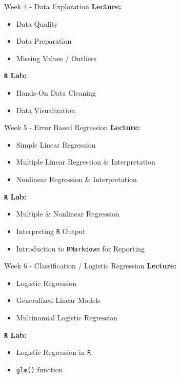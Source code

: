 \documentclass[aspectratio=169,xcolor=dvipsnames]{beamer}
\begin{document}
\begin{frame}{Week 4 - Data Exploration}
\textbf{Lecture:}
    \begin{itemize}
        \setlength{\itemsep}{.25cm}
        \item Data Quality
        \item Data Preparation
        \item Missing Values / Outliers
    \end{itemize}
\textbf{\texttt{R} Lab:}
    \begin{itemize}
        \item Hands-On Data Cleaning
        \item Data Visualization
    \end{itemize}
\end{frame}

\begin{frame}{Week 5 - Error Based Regression}
\textbf{Lecture:}
    \begin{itemize}
        \setlength{\itemsep}{.25cm}
        \item Simple Linear Regression
        \item Multiple Linear Regression \& Interpretation
        \item Nonlinear Regression \& Interpretation
    \end{itemize}
\textbf{\texttt{R} Lab:}
    \begin{itemize}
    \setlength{\itemsep}{.25cm}
        \item Multiple \& Nonlinear Regression
        \item Interpreting \texttt{R} Output
        \item Introduction to \texttt{RMarkdown} for Reporting
    \end{itemize}
\end{frame}

\begin{frame}{Week 6 - Classification / Logistic Regression}
\textbf{Lecture:}
    \begin{itemize}
        \setlength{\itemsep}{.25cm}
        \item Logistic Regression
        \item Generalized Linear Models
        \item Multinomial Logistic Regression
    \end{itemize}
\textbf{\texttt{R} Lab:}
    \begin{itemize}
    \setlength{\itemsep}{.25cm}
        \item Logistic Regression in \texttt{R}
        \item \texttt{glm()} function
    \end{itemize}
\end{frame}
\end{document}
